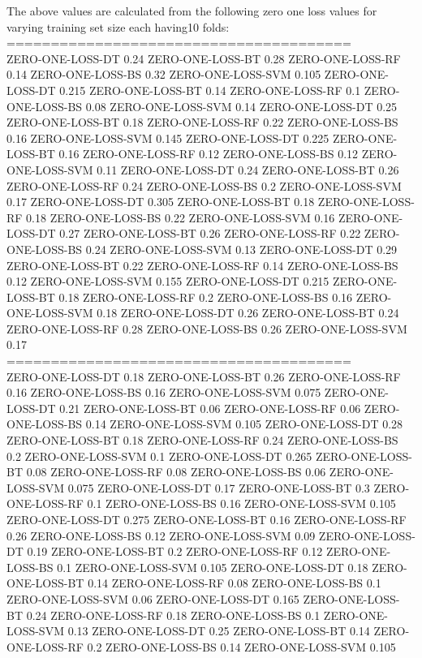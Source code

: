 \documentclass[12pt]{article}
\begin{document}
The above values are calculated from the following zero one loss values for varying training
set size each having10 folds:
\\
=======================================\\
ZERO-ONE-LOSS-DT 0.24
ZERO-ONE-LOSS-BT 0.28
ZERO-ONE-LOSS-RF 0.14
ZERO-ONE-LOSS-BS 0.32
ZERO-ONE-LOSS-SVM 0.105
ZERO-ONE-LOSS-DT 0.215
ZERO-ONE-LOSS-BT 0.14
ZERO-ONE-LOSS-RF 0.1
ZERO-ONE-LOSS-BS 0.08
ZERO-ONE-LOSS-SVM 0.14
ZERO-ONE-LOSS-DT 0.25
ZERO-ONE-LOSS-BT 0.18
ZERO-ONE-LOSS-RF 0.22
ZERO-ONE-LOSS-BS 0.16
ZERO-ONE-LOSS-SVM 0.145
ZERO-ONE-LOSS-DT 0.225
ZERO-ONE-LOSS-BT 0.16
ZERO-ONE-LOSS-RF 0.12
ZERO-ONE-LOSS-BS 0.12
ZERO-ONE-LOSS-SVM 0.11
ZERO-ONE-LOSS-DT 0.24
ZERO-ONE-LOSS-BT 0.26
ZERO-ONE-LOSS-RF 0.24
ZERO-ONE-LOSS-BS 0.2
ZERO-ONE-LOSS-SVM 0.17
ZERO-ONE-LOSS-DT 0.305
ZERO-ONE-LOSS-BT 0.18
ZERO-ONE-LOSS-RF 0.18
ZERO-ONE-LOSS-BS 0.22
ZERO-ONE-LOSS-SVM 0.16
ZERO-ONE-LOSS-DT 0.27
ZERO-ONE-LOSS-BT 0.26
ZERO-ONE-LOSS-RF 0.22
ZERO-ONE-LOSS-BS 0.24
ZERO-ONE-LOSS-SVM 0.13
ZERO-ONE-LOSS-DT 0.29
ZERO-ONE-LOSS-BT 0.22
ZERO-ONE-LOSS-RF 0.14
ZERO-ONE-LOSS-BS 0.12
ZERO-ONE-LOSS-SVM 0.155
ZERO-ONE-LOSS-DT 0.215
ZERO-ONE-LOSS-BT 0.18
ZERO-ONE-LOSS-RF 0.2
ZERO-ONE-LOSS-BS 0.16
ZERO-ONE-LOSS-SVM 0.18
ZERO-ONE-LOSS-DT 0.26
ZERO-ONE-LOSS-BT 0.24
ZERO-ONE-LOSS-RF 0.28
ZERO-ONE-LOSS-BS 0.26
ZERO-ONE-LOSS-SVM 0.17\\
=======================================\\
ZERO-ONE-LOSS-DT 0.18
ZERO-ONE-LOSS-BT 0.26
ZERO-ONE-LOSS-RF 0.16
ZERO-ONE-LOSS-BS 0.16
ZERO-ONE-LOSS-SVM 0.075
ZERO-ONE-LOSS-DT 0.21
ZERO-ONE-LOSS-BT 0.06
ZERO-ONE-LOSS-RF 0.06
ZERO-ONE-LOSS-BS 0.14
ZERO-ONE-LOSS-SVM 0.105
ZERO-ONE-LOSS-DT 0.28
ZERO-ONE-LOSS-BT 0.18
ZERO-ONE-LOSS-RF 0.24
ZERO-ONE-LOSS-BS 0.2
ZERO-ONE-LOSS-SVM 0.1
ZERO-ONE-LOSS-DT 0.265
ZERO-ONE-LOSS-BT 0.08
ZERO-ONE-LOSS-RF 0.08
ZERO-ONE-LOSS-BS 0.06
ZERO-ONE-LOSS-SVM 0.075
ZERO-ONE-LOSS-DT 0.17
ZERO-ONE-LOSS-BT 0.3
ZERO-ONE-LOSS-RF 0.1
ZERO-ONE-LOSS-BS 0.16
ZERO-ONE-LOSS-SVM 0.105
ZERO-ONE-LOSS-DT 0.275
ZERO-ONE-LOSS-BT 0.16
ZERO-ONE-LOSS-RF 0.26
ZERO-ONE-LOSS-BS 0.12
ZERO-ONE-LOSS-SVM 0.09
ZERO-ONE-LOSS-DT 0.19
ZERO-ONE-LOSS-BT 0.2
ZERO-ONE-LOSS-RF 0.12
ZERO-ONE-LOSS-BS 0.1
ZERO-ONE-LOSS-SVM 0.105
ZERO-ONE-LOSS-DT 0.18
ZERO-ONE-LOSS-BT 0.14
ZERO-ONE-LOSS-RF 0.08
ZERO-ONE-LOSS-BS 0.1
ZERO-ONE-LOSS-SVM 0.06
ZERO-ONE-LOSS-DT 0.165
ZERO-ONE-LOSS-BT 0.24
ZERO-ONE-LOSS-RF 0.18
ZERO-ONE-LOSS-BS 0.1
ZERO-ONE-LOSS-SVM 0.13
ZERO-ONE-LOSS-DT 0.25
ZERO-ONE-LOSS-BT 0.14
ZERO-ONE-LOSS-RF 0.2
ZERO-ONE-LOSS-BS 0.14
ZERO-ONE-LOSS-SVM 0.105\\
\end{document}
